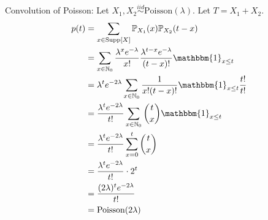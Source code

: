 \documentclass[12pt]{article}
\newcommand{\probsub}[2]{\mathbb{P}_{#1}(#2)}
\newcommand{\indicator}[1]{\mathbbm{1}_{#1}}
\begin{document}
Convolution of Poisson: Let $X_1, X_2 \stackrel{iid}{\sim} \text{Poisson}(\lambda)$. Let $T = X_1 + X_2$. $$\begin{aligned} 
p(t) &= \sum_{x \in \text{Supp}[X]} \probsub{X_1}{x}\probsub{X_2}{t - x} \\ &= \sum_{x \in \mathbb{N}_0} \frac{\lambda^x e^{-\lambda}}{x!} \frac{\lambda^{t - x} e^{-\lambda}}{(t - x)!} \indicator{x \leq t} \\ &= \lambda^t e^{-2\lambda} \sum_{x \in \mathbb{N}_0} \frac{1}{x!(t - x)!} \indicator{x \leq t} \frac{t!}{t!} \\ &= \frac{\lambda^t e^{-2\lambda}}{t!} \sum_{x \in \mathbb{N}_0} \binom{t}{x} \indicator{x \leq t} \\ &= \frac{\lambda^t e^{-2\lambda}}{t!} \sum_{x = 0}^t \binom{t}{x} \\ &= \frac{\lambda^t e^{-2\lambda}}{t!} \cdot 2^t \\ &= \frac{(2\lambda)^t e^{-2\lambda}}{t!} \\ &= \text{Poisson}(2\lambda) \end{aligned} $$ 
\end{document}

